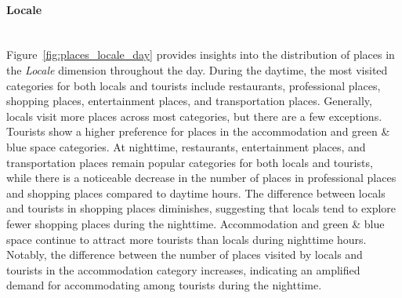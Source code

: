 \documentclass{article}
\newcommand{\subsubsubsection}[1]{\paragraph{#1}\mbox{}\\}
\theoremstyle{definition}
\theoremstyle{remark}
\begin{document}
\subsubsubsection{Locale}
Figure~\ref{fig:places_locale_day} provides insights into the distribution of places in the \textit{Locale} dimension throughout the day. During the daytime, the most visited categories for both locals and tourists include restaurants, professional places, shopping places, entertainment places, and transportation places. Generally, locals visit more places across most categories, but there are a few exceptions. Tourists show a higher preference for places in the accommodation and green \& blue space categories. At nighttime, restaurants, entertainment places, and transportation places remain popular categories for both locals and tourists, while there is a noticeable decrease in the number of places in professional places and shopping places compared to daytime hours. The difference between locals and tourists in shopping places diminishes, suggesting that locals tend to explore fewer shopping places during the nighttime. Accommodation and green \& blue space continue to attract more tourists than locals during nighttime hours. Notably, the difference between the number of places visited by locals and tourists in the accommodation category increases, indicating an amplified demand for accommodating among tourists during the nighttime.
\end{document}
